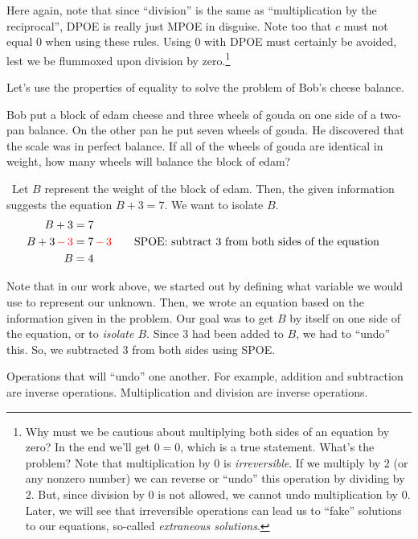 Here again, note that since ``division'' is the same as ``multiplication by the reciprocal'', DPOE is really just MPOE in disguise. Note too that $c$ must not equal 0 when using these rules. Using 0 with DPOE must certainly be avoided, lest we be flummoxed upon division by zero.\footnote{Why must we be cautious about multiplying both sides of an equation by zero? In the end we'll get $0=0$, which is a true statement. What's the problem? Note that multiplication by 0 is \textit{irreversible}. If we multiply by 2 (or any nonzero number) we can reverse or ``undo'' this operation by dividing by 2. But, since division by 0 is not allowed, we cannot undo multiplication by 0. Later, we will see that irreversible operations can lead us to ``fake'' solutions to our equations, so-called \textit{extraneous solutions}.}

Let's use the properties of equality to solve the problem of Bob's cheese balance.

\begin{boxedex}
Bob put a block of edam cheese and three wheels of gouda on one side of a two-pan balance. On the other pan he put seven wheels of gouda. He discovered that the scale was in perfect balance. If all of the wheels of gouda are identical in weight, how many wheels will balance the block of edam?

\exsoln\ Let $B$ represent the weight of the block of edam. Then, the given information suggests the equation $B + 3 = 7$. We want to isolate $B$.
\[\begin{aligned}
B + 3 & = 7\\
B + 3 {\color{red} \,-\,3} & = 7 {\color{red} \,-\,3}
&&\text{\quad SPOE: subtract 3 from both sides of the equation}\\
B & = 4
\end{aligned}\]
\end{boxedex}

Note that in our work above, we started out by defining what variable we would use to represent our unknown. Then, we wrote an equation based on the information given in the problem. Our goal was to get $B$ by itself on one side of the equation, or to \textit{isolate $B$}. Since 3 had been added to $B$, we had to ``undo'' this. So, we subtracted 3 from both sides using SPOE.

\begin{boxeddef}
Operations that will ``undo'' one another. For example, addition and subtraction are inverse operations. Multiplication and division are inverse operations.
\end{boxeddef}

